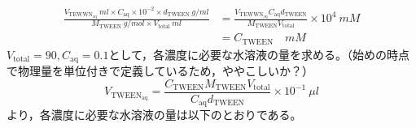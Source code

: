 \documentclass{ltjsarticle}
\begin{document}
\begin{equation}
  \begin{split}
    \frac{V_{\mathrm{TEWWN_{aq}}} \ \si{ml} \times C_{\mathrm{aq}} \times 10^{-2} \times d_{\mathrm{TWEEN}} \ \si{g/ml}}{M_{\mathrm{TWEEN}} \ \si{g/mol} \times V_{\mathrm{total}} \ \si{ml} } &= \frac{V_{\mathrm{TEWWN_{aq}}}C_{\mathrm{aq}} d_{\mathrm{TWEEN}}}{M_{\mathrm{TWEEN}}V_{\mathrm{total}}}\times10^4 \ \si{mM} \\
    &= C_{\mathrm{TWEEN}} \quad\si{mM}
  \end{split}
\end{equation}
$V_{\mathrm{total}}=90,C_{\mathrm{aq}}=0.1 $として，各濃度に必要な水溶液の量を求める。（{\color{red}始めの時点で物理量を単位付きで定義しているため，ややこしいか？}）
\begin{equation}
  V_{\mathrm{TWEEN_{aq}}}=\frac{C_{\mathrm{TWEEN}}M_{\mathrm{TWEEN}}V_{\mathrm{total}}}{C_{\mathrm{aq}}d_{\mathrm{TWEEN}}}\times10^{-1} \ \si{\mu l}
\end{equation}
より，各濃度に必要な水溶液の量は以下のとおりである。\\
\end{document}

